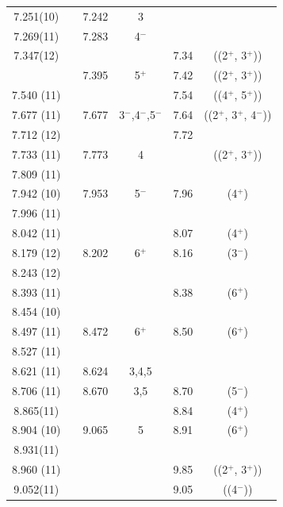 {\begin{center}
\begin{longtable}{cc cc cc}
7.251(10)   &   & 7.242 & 3 &   &   \\
7.269(11)   &   & 7.283 & 4$^-$ &   &   \\
7.347(12)   &   &   &   & 7.34  & ((2$^+$, 3$^+$))          \\
  &   & 7.395 & 5$^+$ & 7.42  & ((2$^+$, 3$^+$))          \\
  7.540 (11)    &   &   &   & 7.54  & ((4$^+$, 5$^+$))          \\
  7.677 (11)    &   & 7.677 & 3$^-$,4$^-$,5$^-$ & 7.64  & ((2$^+$, 3$^+$, 4$^-$))   \\
  7.712 (12)    &   &   &   & 7.72  &                           \\
  7.733 (11)    &   & 7.773 & 4 &   & ((2$^+$, 3$^+$))          \\
  7.809 (11)    &   &   &   &   &                           \\
  7.942 (10)    &   & 7.953 & 5$^-$ & 7.96  & (4$^+$)                   \\
  7.996 (11)    &   &   &   &   &                           \\
  8.042 (11)    &   &   &   & 8.07  & (4$^+$)                   \\
  8.179 (12)    &   & 8.202 & 6$^+$ & 8.16  & (3$^-$)                   \\
  8.243 (12)    &   &   &   &   &                           \\
  8.393 (11)    &   &   &   & 8.38  & (6$^+$)                   \\
  8.454 (10)    &   &   &   &   &                           \\
  8.497 (11)    &   & 8.472 & 6$^+$ & 8.50  & (6$^+$)                   \\
  8.527 (11)    &   &   &   &   &                           \\
  8.621 (11)    &   & 8.624 & 3,4,5 &   &                           \\
  8.706 (11)    &   & 8.670 & 3,5 & 8.70  & (5$^-$)                   \\
   8.865(11)    &   &   &   & 8.84  & (4$^+$)                   \\
  8.904 (10)    &   & 9.065 & 5 & 8.91  & (6$^+$)                   \\
8.931(11) &   &   &   &   &                           \\
  8.960 (11)    &   &   &   & 9.85  & ((2$^+$, 3$^+$))          \\
   9.052(11)    &   &   &   & 9.05  & ((4$^-$))                 \\

\end{longtable}
\end{center}}

